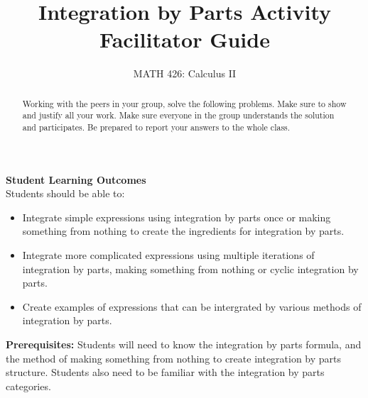 \documentclass{ximera}
\title{Integration by Parts Activity Facilitator Guide}
\author{MATH 426: Calculus II}
\begin{document}
\begin{abstract}
   Working with the peers in your group, solve the following problems. Make sure to show and justify all your work. Make sure everyone in the group understands the solution and participates. Be prepared to report your answers to the whole class. 
\end{abstract}
\maketitle

\textbf{Student Learning Outcomes}\\
Students should be able to: \\
    \begin{itemize}
        \item Integrate simple expressions using integration by parts once or making something from nothing to create the ingredients for integration by parts.
        \item Integrate more complicated expressions using multiple iterations of integration by parts, making something from nothing or cyclic integration by parts.
        \item Create examples of expressions that can be intergrated by various methods of integration by parts.
    \end{itemize}

\textbf{Prerequisites:} Students will need to know the integration by parts formula, and the method of making something from nothing to create integration by parts structure.  Students also need to be familiar with the integration by parts categories.
\end{document}
